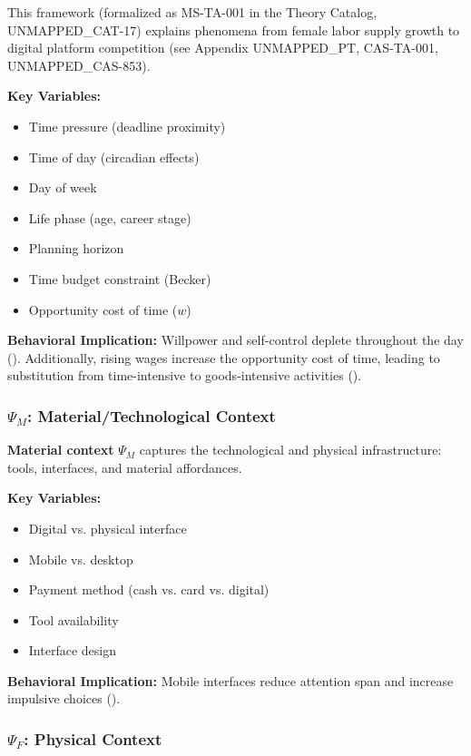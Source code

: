 This framework (formalized as MS-TA-001 in the Theory Catalog, UNMAPPED_CAT-17) explains
phenomena from female labor supply growth to digital platform competition
(see Appendix UNMAPPED_PT, CAS-TA-001, UNMAPPED_CAS-853).

\textbf{Key Variables:}
\begin{itemize}[nosep]
\item Time pressure (deadline proximity)
\item Time of day (circadian effects)
\item Day of week
\item Life phase (age, career stage)
\item Planning horizon
\item Time budget constraint (Becker)
\item Opportunity cost of time ($w$)
\end{itemize}

\textbf{Behavioral Implication:}
Willpower and self-control deplete throughout the day
(\citet{baumeister2007strength}). Additionally, rising wages increase
the opportunity cost of time, leading to substitution from time-intensive
to goods-intensive activities (\citet{becker1965theory}).

\subsubsection{$\Psi_M$: Material/Technological Context}

\begin{definition}
\textbf{Material context} $\Psi_M$ captures the technological and physical infrastructure:
tools, interfaces, and material affordances.
\end{definition}

\textbf{Key Variables:}
\begin{itemize}[nosep]
\item Digital vs. physical interface
\item Mobile vs. desktop
\item Payment method (cash vs. card vs. digital)
\item Tool availability
\item Interface design
\end{itemize}

\textbf{Behavioral Implication:}
Mobile interfaces reduce attention span and increase impulsive choices
(\citet{ghose2013mobile}).

\subsubsection{$\Psi_F$: Physical Context}

